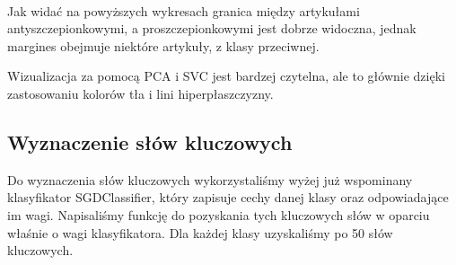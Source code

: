 \documentclass[11pt]{article}
\begin{document}
    \begin{center}
    \end{center}
    { \hspace*{\fill} \\}

    Jak widać na powyższych wykresach granica między artykułami antyszczepionkowymi,
    a proszczepionkowymi jest dobrze widoczna, jednak margines obejmuje niektóre
    artykuły, z klasy przeciwnej.

    Wizualizacja za pomocą PCA i SVC jest bardzej czytelna, ale to głównie dzięki
    zastosowaniu kolorów tła i lini hiperpłaszczyzny.
    
\subsection*{Wyznaczenie słów kluczowych}

Do wyznaczenia słów kluczowych wykorzystaliśmy wyżej już wspominany klasyfikator SGDClassifier, 
który zapisuje cechy danej klasy oraz odpowiadające im wagi. Napisaliśmy funkcję 
do pozyskania tych kluczowych słów w oparciu właśnie o wagi klasyfikatora. Dla każdej klasy
uzyskaliśmy po 50 słów kluczowych.
\end{document}
